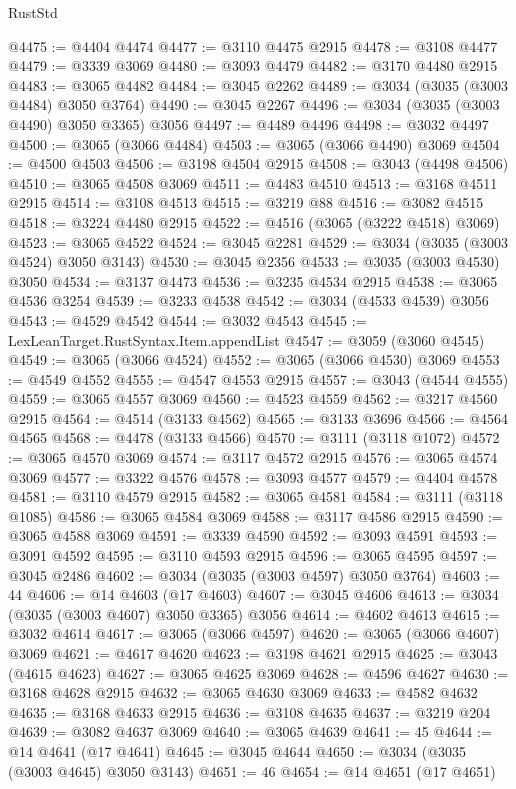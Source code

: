 \begin{lexlean}{RustStd}
\begin{coremodule}
@4475 := @4404 @4474
@4477 := @3110 @4475 @2915
@4478 := @3108 @4477
@4479 := @3339 @3069
@4480 := @3093 @4479
@4482 := @3170 @4480 @2915
@4483 := @3065 @4482
@4484 := @3045 @2262
@4489 := @3034 (@3035 (@3003 @4484) @3050 @3764)
@4490 := @3045 @2267
@4496 := @3034 (@3035 (@3003 @4490) @3050 @3365) @3056
@4497 := @4489 @4496
@4498 := @3032 @4497
@4500 := @3065 (@3066 @4484)
@4503 := @3065 (@3066 @4490) @3069
@4504 := @4500 @4503
@4506 := @3198 @4504 @2915
@4508 := @3043 (@4498 @4506)
@4510 := @3065 @4508 @3069
@4511 := @4483 @4510
@4513 := @3168 @4511 @2915
@4514 := @3108 @4513
@4515 := @3219 @88
@4516 := @3082 @4515
@4518 := @3224 @4480 @2915
@4522 := @4516 (@3065 (@3222 @4518) @3069)
@4523 := @3065 @4522
@4524 := @3045 @2281
@4529 := @3034 (@3035 (@3003 @4524) @3050 @3143)
@4530 := @3045 @2356
@4533 := @3035 (@3003 @4530) @3050
@4534 := @3137 @4473
@4536 := @3235 @4534 @2915
@4538 := @3065 @4536 @3254
@4539 := @3233 @4538
@4542 := @3034 (@4533 @4539) @3056
@4543 := @4529 @4542
@4544 := @3032 @4543
@4545 := LexLeanTarget.RustSyntax.Item.appendList
@4547 := @3059 (@3060 @4545)
@4549 := @3065 (@3066 @4524)
@4552 := @3065 (@3066 @4530) @3069
@4553 := @4549 @4552
@4555 := @4547 @4553 @2915
@4557 := @3043 (@4544 @4555)
@4559 := @3065 @4557 @3069
@4560 := @4523 @4559
@4562 := @3217 @4560 @2915
@4564 := @4514 (@3133 @4562)
@4565 := @3133 @3696
@4566 := @4564 @4565
@4568 := @4478 (@3133 @4566)
@4570 := @3111 (@3118 @1072)
@4572 := @3065 @4570 @3069
@4574 := @3117 @4572 @2915
@4576 := @3065 @4574 @3069
@4577 := @3322 @4576
@4578 := @3093 @4577
@4579 := @4404 @4578
@4581 := @3110 @4579 @2915
@4582 := @3065 @4581
@4584 := @3111 (@3118 @1085)
@4586 := @3065 @4584 @3069
@4588 := @3117 @4586 @2915
@4590 := @3065 @4588 @3069
@4591 := @3339 @4590
@4592 := @3093 @4591
@4593 := @3091 @4592
@4595 := @3110 @4593 @2915
@4596 := @3065 @4595
@4597 := @3045 @2486
@4602 := @3034 (@3035 (@3003 @4597) @3050 @3764)
@4603 := 44
@4606 := @14 @4603 (@17 @4603)
@4607 := @3045 @4606
@4613 := @3034 (@3035 (@3003 @4607) @3050 @3365) @3056
@4614 := @4602 @4613
@4615 := @3032 @4614
@4617 := @3065 (@3066 @4597)
@4620 := @3065 (@3066 @4607) @3069
@4621 := @4617 @4620
@4623 := @3198 @4621 @2915
@4625 := @3043 (@4615 @4623)
@4627 := @3065 @4625 @3069
@4628 := @4596 @4627
@4630 := @3168 @4628 @2915
@4632 := @3065 @4630 @3069
@4633 := @4582 @4632
@4635 := @3168 @4633 @2915
@4636 := @3108 @4635
@4637 := @3219 @204
@4639 := @3082 @4637 @3069
@4640 := @3065 @4639
@4641 := 45
@4644 := @14 @4641 (@17 @4641)
@4645 := @3045 @4644
@4650 := @3034 (@3035 (@3003 @4645) @3050 @3143)
@4651 := 46
@4654 := @14 @4651 (@17 @4651)

\end{coremodule}
\end{lexlean}
